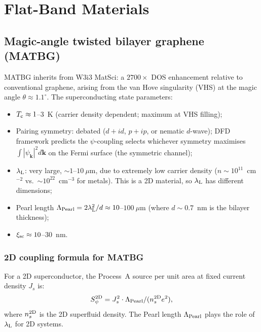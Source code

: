 \documentclass[11pt]{article}
\newcommand{\lambdaL}{\lambda_{\rm L}}
\newcommand{\xsc}{\xi_{\rm sc}}
\newcommand{\Tc}{T_{\rm c}}
\begin{document}
\section{Flat-Band Materials}
\label{sec:flatband}

\subsection{Magic-angle twisted bilayer graphene (MATBG)}

MATBG inherits from W3i3 MatSci: a $2700\times$ DOS enhancement relative to
conventional graphene, arising from the van Hove singularity (VHS) at the
magic angle $\theta \approx 1.1^\circ$. The superconducting state parameters:

\begin{itemize}
\item $\Tc \approx 1$--$3$~K (carrier density dependent; maximum at VHS filling);
\item Pairing symmetry: debated ($d + id$, $p+ip$, or nematic $d$-wave);
  DFD framework predicts the $\psi$-coupling selects whichever symmetry
  maximises $\int |\psi_{\mathbf{k}}|^2 d\mathbf{k}$ on the Fermi surface
  (the symmetric channel);
\item $\lambdaL$: very large, $\sim 1$--$10~\mu$m, due to extremely low
  carrier density ($n \sim 10^{11}$~cm$^{-2}$ vs.\ $\sim 10^{22}$~cm$^{-3}$
  for metals). This is a 2D material, so $\lambdaL$ has different dimensions;
\item Pearl length $\Lambda_{\rm Pearl} = 2\lambdaL^2/d \approx 10$--$100~\mu$m
  (where $d \sim 0.7$~nm is the bilayer thickness);
\item $\xsc \approx 10$--$30$~nm.
\end{itemize}

\subsubsection{2D coupling formula for MATBG}

For a 2D superconductor, the Process~A source per unit area at fixed current
density $J_s$ is:
\begin{equation}
S_\psi^{\rm 2D} = J_s^2 \cdot \Lambda_{\rm Pearl} / (n_s^{\rm 2D} e^2),
\end{equation}
where $n_s^{\rm 2D}$ is the 2D superfluid density. The Pearl length
$\Lambda_{\rm Pearl}$ plays the role of $\lambdaL$ for 2D systems.
\end{document}
